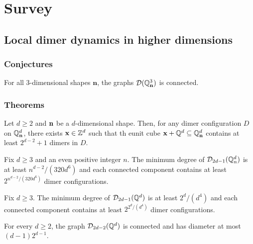 \chapter{Survey}

\section{Local dimer dynamics in higher dimensions \cite{hartarsky2023local}}

\subsection{Conjectures}

\begin{conjecture}\label{conj-dynamics-1}
	For all $3$-dimensional shapes $\mathbf{n}$, the graphs $\mathcal{D}(\mathbb{Q}_\mathbf{n}^3)$ is connected.
\end{conjecture}

\subsection{Theorems}
\begin{theorem}\label{thm-dynamics-3}
	Let $d \geq 2$ and $\mathbf{n}$ be a $d$-dimensional shape. Then, for any dimer configuration $D$ on $\mathbb{Q}_{\mathbf{n}}^d$, there exists $\mathbf{x} \in \mathbb{Z}^d$ such that th eunit cube $\mathbf{x} + \mathbb{Q}^d \subseteq \mathbb{Q}_{\mathbf{n}}^d$ contains at least $2^{d - 2} + 1$ dimers in $D$.
\end{theorem}

\begin{theorem}\label{thm-dynamics-4}
	Fix $d \geq 3$ and an even positive integer $n$. The minimum degree of $\mathcal{D}_{2d - 1}(\mathbb{Q}^d_n)$ is at least $n^{d - 2}/(320d^6)$ and each connected component contains at least $2^{n^{d - 2}/(320d^6)}$ dimer configurations.
\end{theorem}

\begin{theorem}\label{thm-dynamics-5}
	Fix $d \geq 3$. The minimum degree of $\mathcal{D}_{2d - 1}(\mathbb{Q}^d)$ is at least $2^d/(d^4)$ and each connected component contains at least $2^{2^d/(d^4)}$ dimer configurations.
\end{theorem}

\begin{theorem}[Ergodicity on $\bQ^d$]\label{thm-dynamics-6}
	For every $d \geq 2$, the graph $\mathcal{D}_{2d - 2}(\mathbb{Q}^d)$ is connected and has diameter at most $(d - 1) 2^{d - 1}$.
\end{theorem}

